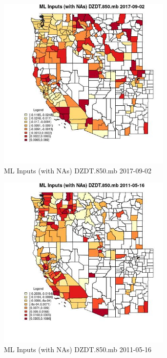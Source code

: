 \begin{figure} 
\centering  
\includegraphics[width=0.77\textwidth]{Code_Outputs/Report_ML_input_PM25_Step4_part_e_de_duplicated_aves_compiled_2019-05-21wNAs_CountyDZDT850mbMean2017-09-02.jpg} 
\caption{\label{fig:Report_ML_input_PM25_Step4_part_e_de_duplicated_aves_compiled_2019-05-21wNAsCountyDZDT850mbMean2017-09-02}ML Inputs (with NAs) DZDT.850.mb 2017-09-02} 
\end{figure} 
 

\begin{figure} 
\centering  
\includegraphics[width=0.77\textwidth]{Code_Outputs/Report_ML_input_PM25_Step4_part_e_de_duplicated_aves_compiled_2019-05-21wNAs_CountyDZDT850mbMean2011-05-16.jpg} 
\caption{\label{fig:Report_ML_input_PM25_Step4_part_e_de_duplicated_aves_compiled_2019-05-21wNAsCountyDZDT850mbMean2011-05-16}ML Inputs (with NAs) DZDT.850.mb 2011-05-16} 
\end{figure} 
 

